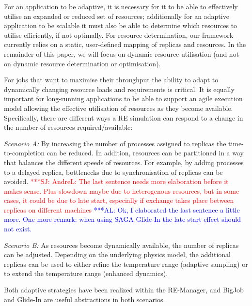 \documentclass{rspublic}
\newcommand{\alnote}[1]{ {\textcolor{blue} { ***AL: #1 }}}
\newcommand{\jhanote}[1]{ {\textcolor{red} { ***SJ: #1 }}}
\newcommand{\alnote}[1]{}
\newcommand{\jhanote}[1]{}
\newcommand{\glidein}[1]{Glide-In }
\begin{document}
For an application to be adaptive, it is necessary for it to be able
to effectively utilise an expanded or reduced set of resources;
additionally for an adaptive application to be scalable it must also
be able to determine which resources to utilise efficiently, if not
optimally.  For resource determination, our framework currently relies
on a static, user-defined mapping of replicas and resources.  In the
remainder of this paper, we will focus on dynamic resource utilisation
(and not on dynamic resource determination or optimisation).




For jobs that want to maximise their throughput the ability to adapt
to dynamically changing resource loads and requirements is
critical. It is equally important for long-running applications to be
able to support an agile execution model allowing the effective
utilisation of resources as they become available.  Specifically,
there are different ways a RE simulation can respond to a change in
the number of resources required/available:
\begin{compactitem}         
\item {\it Scenario A:} By increasing the number of processes assigned
  to replicas the time-to-completion can be reduced. In addition,
  resources can be partitioned in a way that balances the different
  speeds of resources.  For example, by adding processes to a 
  delayed replica, bottlenecks due to synchronisation of replicas can
  be avoided.
  \jhanote{AndreL: The last sentence needs more elaboration before it
    makes sense. Plus slowdown maybe due to heterogenous resources,
    but in some cases, it could be due to late start, especially if
    exchange takes place between replicas on different machines}
  \alnote{Ok, I elaborated the last sentence a little more. One more
    remark: when using SAGA Glide-In the late start effect should not
    exist.}

\item {\it Scenario B:} As resources become dynamically available, the
  number of replicas can be adjusted. Depending on the underlying
  physics model, the additional replicas can be used to either refine
  the temperature range (adaptive sampling) or to extend the
  temperature range (enhanced dynamics).
\end{compactitem}           
Both adaptive strategies have been realized within the RE-Manager, and
BigJob and Glide-In are useful abstractions in both scenarios. 
\end{document}
